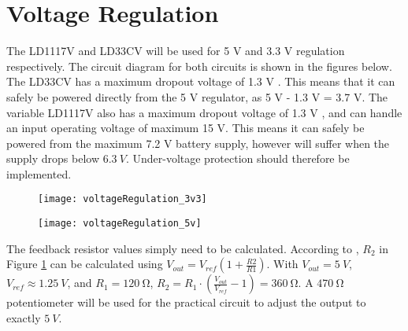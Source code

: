 \graphicspath{{content/2_design/figures}}

\section{Voltage Regulation}

The LD1117V and LD33CV will be used for 5 V and 3.3 V regulation respectively. The circuit diagram for both circuits is shown in the figures below.
The LD33CV has a maximum dropout voltage of 1.3 V \cite{datasheetLD1117}. This means that it can safely be powered directly from the 5 V regulator, as 5 V - 1.3 V = 3.7 V.
The variable LD1117V also has a maximum dropout voltage of 1.3 V \cite{datasheetLD1117}, and can handle an input operating voltage of maximum 15 V. This means it can safely be
powered from the maximum 7.2 V battery supply, however will suffer when the supply drops below $\SI{6.3}{V}$. Under-voltage protection should therefore be implemented.

\begin{figure}[!htb]
    \centering
    \begin{minipage}{.4\textwidth}
        \centering
        \texttt{[image: voltageRegulation\_3v3]}
        \label{fig:voltageRegulation_3v3}
    \end{minipage}
    \begin{minipage}{.4\textwidth}
        \centering
        \texttt{[image: voltageRegulation\_5v]}
        \label{fig:voltageRegulation_5v}
    \end{minipage}
\end{figure}

The feedback resistor values simply need to be calculated. According to \cite{datasheetLD1117}, $R_2$ in Figure \ref{fig:voltageRegulation_5v}
can be calculated using $V_{out} = V_{ref} (1 + \frac{R2}{R1})$. With $V_{out} = \SI{5}{V}$, $V_{ref} \approx \SI{1.25}{V}$, and $R_1 = \SI{120}{\ohm}$,
$R_2 = R_1 \cdot \left(\frac{V_{out}}{V_{ref}} - 1\right) = \SI{360}{\ohm}$. A $\SI{470}{\ohm}$ potentiometer will be used for the practical circuit to adjust the output to exactly $\SI{5}{V}$.

\pagebreak